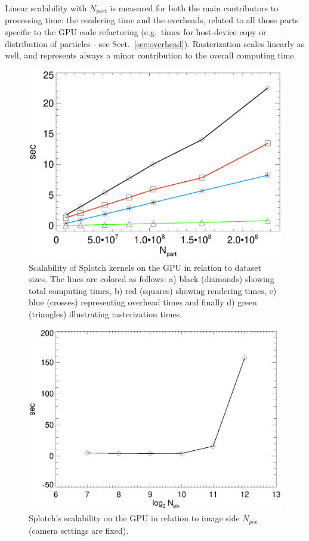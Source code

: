 \documentclass[smallextended]{svjour3}
\begin{document}
Linear scalability with $N_{part}$ is measured for both the main contributors to processing time: the rendering time and the overheads, related to all those parts specific to the GPU code refactoring (e.g.\ times for host-device copy or distribution of particles - see Sect.~\ref{sec:overhead}).
Rasterization scales linearly as well, and represents always a minor contribution to the overall computing time.   

\begin{figure}
\includegraphics[scale=0.5]{scalan.eps}
\caption{Scalability of Splotch kernels on the GPU in relation to dataset sizes. 
The lines are colored as follows: a) black (diamonds) showing total computing times, b) red (squares) showing rendering times, c) blue (crosses) representing overhead times and finally d) green (triangles) illustrating rasterization times.}
\label{fig:scalability}
\end{figure}

\begin{figure}
\includegraphics[scale=0.5]{pixels.eps}
\caption{Splotch's scalability on the GPU in relation to image side $N_{pix}$ (camera settings are fixed).}
\label{fig:pixels}
\end{figure}
\end{document}
